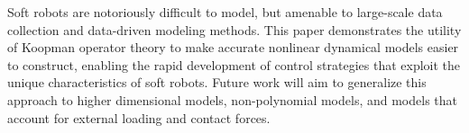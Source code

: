 

Soft robots are notoriously difficult to model, but amenable to large-scale data collection and data-driven modeling methods. 
This paper demonstrates the utility of Koopman operator theory to make accurate nonlinear dynamical models easier to construct, enabling  the  rapid  development  of control strategies that exploit the unique characteristics of soft robots.
Future work will aim to generalize this approach to higher dimensional models, non-polynomial models, and models that account for external loading and contact forces.